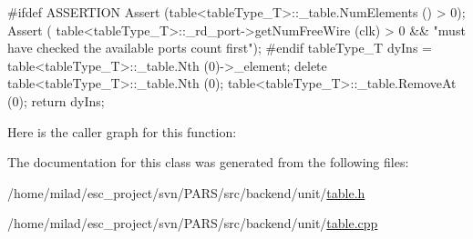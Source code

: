 \begin{DoxyCode}
                                              {
#ifdef ASSERTION
    Assert (table<tableType_T>::_table.NumElements () > 0);
    Assert ( table<tableType_T>::_rd_port->getNumFreeWire (clk) > 0 && "must have
       checked the available ports count first");
#endif
    tableType_T dyIns = table<tableType_T>::_table.Nth (0)->_element;
    delete table<tableType_T>::_table.Nth (0);
    table<tableType_T>::_table.RemoveAt (0);
    return dyIns;
}
\end{DoxyCode}


Here is the caller graph for this function:




The documentation for this class was generated from the following files:\begin{DoxyCompactItemize}
\item 
/home/milad/esc\_\-project/svn/PARS/src/backend/unit/\hyperlink{table_8h}{table.h}\item 
/home/milad/esc\_\-project/svn/PARS/src/backend/unit/\hyperlink{table_8cpp}{table.cpp}\end{DoxyCompactItemize}
